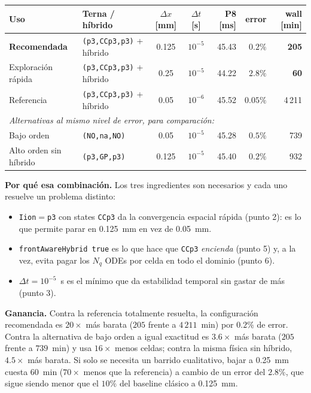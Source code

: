 \documentclass[11pt,a4paper]{article}
\newcommand{\code}[1]{\texttt{\small #1}}
\begin{document}
\begin{center}\footnotesize
\begin{tabular}{llccrrr}
\toprule
Uso & Terna / híbrido & $\Delta x$ [mm] & $\Delta t$ [s] & P8 [ms] & error & wall [min]\\
\midrule
\textbf{Recomendada} & \code{(p3,CCp3,p3)} + híbrido & 0.125 & $10^{-5}$ & 45.43 & $0.2\%$ & \textbf{205}\\
Exploración rápida   & \code{(p3,CCp3,p3)} + híbrido & 0.25  & $10^{-5}$ & 44.22 & $2.8\%$ & \textbf{60}\\
Referencia           & \code{(p3,CCp3,p3)} + híbrido & 0.05  & $10^{-6}$ & 45.52 & $0.05\%$ & 4\,211\\
\midrule
\multicolumn{7}{l}{\emph{Alternativas al mismo nivel de error, para comparación:}}\\
Bajo orden           & \code{(NO,na,NO)}             & 0.05  & $10^{-5}$ & 45.28 & $0.5\%$ & 739\\
Alto orden sin híbrido & \code{(p3,GP,p3)}           & 0.125 & $10^{-5}$ & 45.40 & $0.2\%$ & 932\\
\bottomrule
\end{tabular}
\end{center}

\noindent\textbf{Por qué esa combinación.} Los tres ingredientes son necesarios y cada
uno resuelve un problema distinto:
\begin{itemize}[topsep=2pt,itemsep=2pt,leftmargin=1.4em]
  \item \code{Iion}$=$\code{p3} con states \code{CCp3} da la convergencia espacial
        rápida (punto 2): es lo que permite parar en \SI{0.125}{mm} en vez de
        \SI{0.05}{mm}.
  \item \code{frontAwareHybrid true} es lo que hace que \code{CCp3} \emph{encienda}
        (punto 5) y, a la vez, evita pagar los $N_q$ ODEs por celda en todo el dominio
        (punto 6).
  \item $\Delta t=10^{-5}$~s es el mínimo que da estabilidad temporal sin gastar de
        más (punto 3).
\end{itemize}

\noindent\textbf{Ganancia.} Contra la referencia totalmente resuelta, la configuración
recomendada es $20\times$ más barata ($205$ frente a $4\,211$~min) por $0.2\%$ de error.
Contra la alternativa de bajo orden a igual exactitud es $3.6\times$ más barata ($205$
frente a $739$~min) y usa $16\times$ menos celdas; contra la misma física sin híbrido,
$4.5\times$ más barata. Si solo se necesita un barrido cualitativo, bajar a
\SI{0.25}{mm} cuesta $60$~min ($70\times$ menos que la referencia) a cambio de un error
del $2.8\%$, que sigue siendo menor que el $10\%$ del baseline clásico a \SI{0.125}{mm}.
\end{document}

